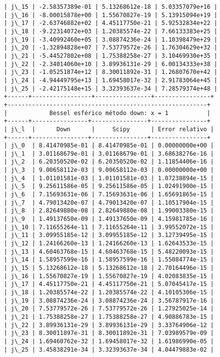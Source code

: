 \documentclass[9pt]{article}
\begin{document}
\begin{Verbatim}[commandchars=\\\{\}]
| j\_15 | -2.58357389e-01 | 5.13268612e-18 | 5.03357079e+16 |
| j\_16 | -8.00015878e+00 | 1.55670827e-19 | 5.13915094e+19 |
| j\_17 | -2.63746882e+02 | 4.45117750e-21 | 5.92532834e+22 |
| j\_18 | -9.22314072e+03 | 1.20385574e-22 | 7.66133383e+25 |
| j\_19 | -3.40992460e+05 | 3.08874236e-24 | 1.10398479e+29 |
| j\_20 | -1.32894828e+07 | 7.53779572e-26 | 1.76304629e+32 |
| j\_21 | -5.44527802e+08 | 1.75388258e-27 | 3.10469930e+35 |
| j\_22 | -2.34014060e+10 | 3.89936131e-29 | 6.00134333e+38 |
| j\_23 | -1.05251874e+12 | 8.30011892e-31 | 1.26807670e+42 |
| j\_24 | -4.94449795e+13 | 1.69458017e-32 | 2.91783064e+45 |
| j\_25 | -2.42175148e+15 | 3.32393637e-34 | 7.28579374e+48 |
+------+-----------------+----------------+----------------+
+---------------------------------------------------------+
|            Bessel esférico método down: x = 1           |
+------+----------------+----------------+----------------+
| j\_l  |      Down      |     Scipy      | Error relativo |
+------+----------------+----------------+----------------+
| j\_0  | 8.41470985e-01 | 8.41470985e-01 | 0.00000000e+00 |
| j\_1  | 3.01168679e-01 | 3.01168679e-01 | 3.68638276e-16 |
| j\_2  | 6.20350520e-02 | 6.20350520e-02 | 1.11854406e-16 |
| j\_3  | 9.00658112e-03 | 9.00658112e-03 | 0.00000000e+00 |
| j\_4  | 1.01101581e-03 | 1.01101581e-03 | 1.07238894e-15 |
| j\_5  | 9.25611586e-05 | 9.25611586e-05 | 1.02491900e-15 |
| j\_6  | 7.15693631e-06 | 7.15693631e-06 | 1.65691865e-15 |
| j\_7  | 4.79013420e-07 | 4.79013420e-07 | 1.10517904e-15 |
| j\_8  | 2.82649880e-08 | 2.82649880e-08 | 1.99003380e-15 |
| j\_9  | 1.49137650e-09 | 1.49137650e-09 | 4.15981785e-16 |
| j\_10 | 7.11655264e-11 | 7.11655264e-11 | 3.99552072e-15 |
| j\_11 | 3.09955185e-12 | 3.09955185e-12 | 3.12739495e-15 |
| j\_12 | 1.24166260e-13 | 1.24166260e-13 | 1.62643533e-15 |
| j\_13 | 4.60463768e-15 | 4.60463768e-15 | 5.48220093e-15 |
| j\_14 | 1.58957599e-16 | 1.58957599e-16 | 1.55084774e-15 |
| j\_15 | 5.13268612e-18 | 5.13268612e-18 | 2.70164496e-15 |
| j\_16 | 1.55670827e-19 | 1.55670827e-19 | 4.02083835e-15 |
| j\_17 | 4.45117750e-21 | 4.45117750e-21 | 5.07045417e-15 |
| j\_18 | 1.20385574e-22 | 1.20385574e-22 | 4.10105306e-15 |
| j\_19 | 3.08874236e-24 | 3.08874236e-24 | 3.56787917e-16 |
| j\_20 | 7.53779572e-26 | 7.53779572e-26 | 1.27925025e-14 |
| j\_21 | 1.75388258e-27 | 1.75388258e-27 | 4.90886783e-15 |
| j\_22 | 3.89936131e-29 | 3.89936131e-29 | 3.33764906e-12 |
| j\_23 | 8.30011897e-31 | 8.30011892e-31 | 7.03989579e-09 |
| j\_24 | 1.69460762e-32 | 1.69458017e-32 | 1.61986990e-05 |
| j\_25 | 3.45838291e-34 | 3.32393637e-34 | 4.04479883e-02 |

\end{Verbatim}
\end{document}
